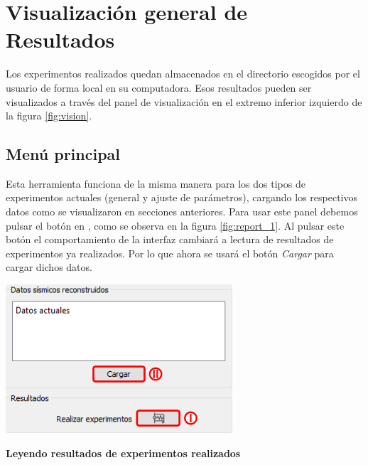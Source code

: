\documentclass[12pt,twoside,letter]{ol-softwaremanual}
\newcommand*\circled[1]{\tikz[baseline=(char.base)]{
            \node[shape=circle,draw,inner sep=2pt] (char) {#1};}}
\newenvironment{Figure}
  {\par\medskip\noindent\minipage{\linewidth}}
  {\endminipage\par\medskip}
\begin{document}
\section{Visualización general de Resultados}

Los experimentos realizados quedan almacenados en el directorio escogidos por el usuario de forma local en su computadora. Esos resultados pueden ser visualizados a través del panel de visualización \circled{6} en el extremo inferior izquierdo de la figura \ref{fig:vision}.

\subsection{Menú principal}

\begin{multicols}{2}

Esta herramienta funciona de la misma manera para los dos tipos de experimentos actuales (general y ajuste de parámetros), cargando los respectivos datos como se visualizaron en secciones anteriores. Para usar este panel debemos pulsar el botón en \circled{1}, como se observa en la figura \ref{fig:report_1}. Al pulsar este botón el comportamiento de la interfaz cambiará a lectura de resultados de experimentos ya realizados. Por lo que ahora se usará el botón \emph{Cargar} \circled{2} para cargar dichos datos.

\begin{Figure}
    \centering
    \includegraphics[width=0.8\linewidth]{report-1.png}
    \label{fig:report_1}
\end{Figure}

\end{multicols}

\textbf{Leyendo resultados de experimentos realizados}
\end{document}
